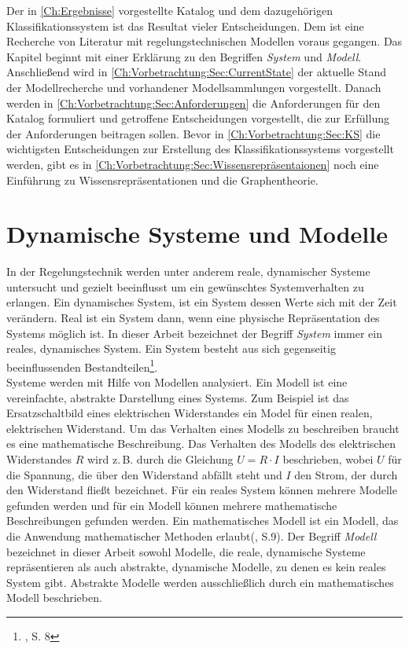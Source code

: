 Der in \ref{Ch:Ergebnisse} vorgestellte Katalog und dem dazugehörigen Klassifikationssystem ist das Resultat vieler Entscheidungen. Dem ist eine Recherche von Literatur mit regelungstechnischen Modellen voraus gegangen. Das Kapitel beginnt mit einer Erklärung zu den Begriffen \textit{System} und \textit{Modell}. Anschließend wird in \ref{Ch:Vorbetrachtung:Sec:CurrentState} der aktuelle Stand der Modellrecherche und vorhandener Modellsammlungen vorgestellt. Danach werden in \ref{Ch:Vorbetrachtung:Sec:Anforderungen} die Anforderungen für den Katalog formuliert und getroffene Entscheidungen vorgestellt, die zur Erfüllung der Anforderungen beitragen sollen. Bevor in \ref{Ch:Vorbetrachtung:Sec:KS} die wichtigsten Entscheidungen zur Erstellung des Klassifikationssystems vorgestellt werden, gibt es in \ref{Ch:Vorbetrachtung:Sec:Wissensrepräsentaionen} noch eine Einführung zu Wissensrepräsentationen und die Graphentheorie.   

\section{Dynamische Systeme und Modelle}
\label{Ch:Vorbetrachtung:Sec:SystemeModelle}
In der Regelungstechnik werden unter anderem reale, dynamischer Systeme untersucht und gezielt beeinflusst um ein gewünschtes Systemverhalten zu erlangen. Ein dynamisches System, ist ein System dessen Werte sich mit der Zeit verändern. Real ist ein System dann, wenn eine physische Repräsentation des Systems möglich ist. In dieser Arbeit bezeichnet der Begriff \textit{System} immer ein reales, dynamisches System. Ein System besteht aus sich gegenseitig beeinflussenden Bestandteilen\footnote{\cite{LUD95}, S. 8}.\\
Systeme werden mit Hilfe von Modellen analysiert. Ein Modell ist eine vereinfachte, abstrakte Darstellung eines Systems. Zum Beispiel ist das Ersatzschaltbild eines elektrischen Widerstandes ein Model für einen realen, elektrischen Widerstand. Um das Verhalten eines Modells zu beschreiben braucht es eine mathematische Beschreibung. Das Verhalten des Modells des elektrischen Widerstandes $R$ wird z.\,B. durch die Gleichung $U=R\cdot I$ beschrieben, wobei $U$ für die Spannung, die über den Widerstand abfällt steht und $I$ den Strom, der durch den Widerstand fließt bezeichnet. Für ein reales System können mehrere Modelle gefunden werden und für ein Modell können mehrere mathematische Beschreibungen gefunden werden. Ein mathematisches Modell ist ein Modell, das die Anwendung mathematischer Methoden erlaubt(\cite{GRVO16}, S.9). Der Begriff \textit{Modell} bezeichnet in dieser Arbeit sowohl Modelle, die reale, dynamische Systeme repräsentieren als auch abstrakte, dynamische Modelle, zu denen es kein reales System gibt. Abstrakte Modelle werden ausschließlich durch ein mathematisches Modell beschrieben.

